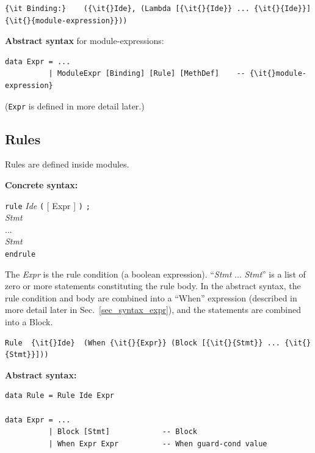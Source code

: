 \documentclass[11pt]{article}
\newcommand{\hm}{\hspace*{1em}}
\newcommand{\nterm}[1]{\emph{#1}}
\newcommand{\term}[1]{\texttt{#1}}
\newcommand{\many}[2]{#1 #2 ... #2 #1}
\newcommand{\opt}[1]{[ #1 ]}
\newcommand{\gram}[2]{    \hm\makebox[10em][l]{\it #1}\makebox[1.5em][l]{::=}    #2}
\newcommand{\grammore}[1]{\hm\makebox[10em][l]{      }\makebox[1.5em][l]{}       #1}
\begin{document}
\begin{Verbatim}[frame=single, commandchars=\\\{\}]
{\it Binding:}    ({\it{}Ide}, (Lambda [{\it{}{Ide}} ... {\it{}{Ide}}] {\it{}{module-expression}}))
\end{Verbatim}

{\bf Abstract syntax} for module-expressions:

\begin{Verbatim}[frame=single, commandchars=\\\{\}]
data Expr = ...
          | ModuleExpr [Binding] [Rule] [MethDef]    -- {\it{}module-expression}
\end{Verbatim}

(\term{Expr} is defined in more detail later.)


\subsection{Rules}

Rules are defined inside modules.

{\bf Concrete syntax:}

\gram{Rule}{\term{rule} \nterm{Ide} \term{(} \opt{Expr} \term{)} \term{;}} \\
\grammore{\hm \nterm{Stmt}} \\
\grammore{\hm ...} \\
\grammore{\hm \nterm{Stmt}} \\
\grammore{\term{endrule}}

The \nterm{Expr} is the rule condition (a boolean expression).
``\many{\nterm{Stmt}}{\hm}'' is a list of zero or more statements
constituting the rule body.  In the abstract syntax, the rule
condition and body are combined into a ``When'' expression (described
in more detail later in Sec.~\ref{sec_syntax_expr}), and the
statements are combined into a Block.

\begin{Verbatim}[frame=single, commandchars=\\\{\}]
    Rule  {\it{}Ide}  (When {\it{}{Expr}} (Block [{\it{}{Stmt}} ... {\it{}{Stmt}}]))
\end{Verbatim}

{\bf Abstract syntax:}

\begin{Verbatim}[frame=single, commandchars=\\\{\}]
data Rule = Rule Ide Expr

data Expr = ...
          | Block [Stmt]            -- Block
          | When Expr Expr          -- When guard-cond value
\end{Verbatim}
\end{document}
